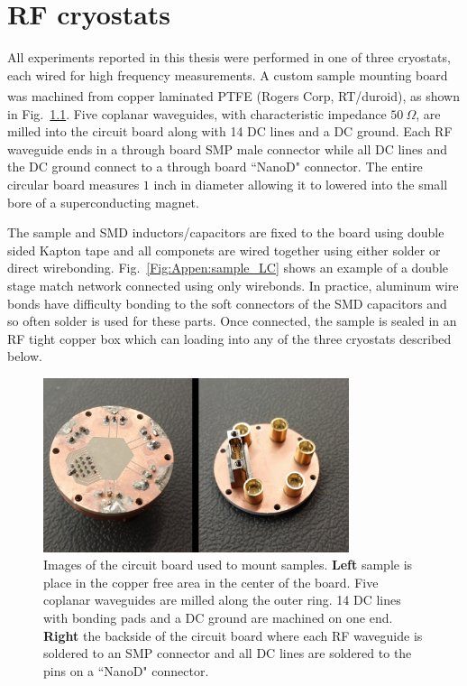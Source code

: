 \chapter{RF cryostats}
\label{appen:RF_cryostats}
All experiments reported in this thesis were performed in one of three cryostats, each wired for high frequency measurements. A custom sample mounting board was machined from copper laminated PTFE (Rogers Corp, RT/duroid\textsuperscript{\textregistered}), as shown in Fig.~\ref{Fig:Appen:sample_board}. Five coplanar waveguides, with characteristic impedance $50~\Omega$, are milled into the circuit board along with 14 DC lines and a DC ground. Each RF waveguide ends in a through board SMP male connector while all DC lines and the DC ground connect to a through board ``NanoD" connector. The entire circular board measures $1$ inch in diameter allowing it to lowered into the small bore of a superconducting magnet. 

The sample and SMD inductors/capacitors are fixed to the board using double sided Kapton tape and all componets are wired together using either solder or direct wirebonding. Fig.~\ref{Fig:Appen:sample_LC} shows an example of a double stage match network connected using only wirebonds. In practice, aluminum wire bonds have difficulty bonding to the soft connectors of the SMD capacitors and so often solder is used for these parts. Once connected, the sample is sealed in an RF tight copper box which can loading into any of the three cryostats described below.

\begin{figure}
\centering
\includegraphics[width=0.8\textwidth]{figures/appendix/cryostats/sample_package.jpg}
\caption{Images of the circuit board used to mount samples. \textbf{Left} sample is place in the copper free area in the center of the board. Five coplanar waveguides are milled along the outer ring. 14 DC lines with bonding pads and a DC ground are machined on one end. \textbf{Right} the backside of the circuit board where each RF waveguide is soldered to an SMP connector and all DC lines are soldered to the pins on a ``NanoD" connector.}
\label{Fig:Appen:sample_board}
\end{figure}


